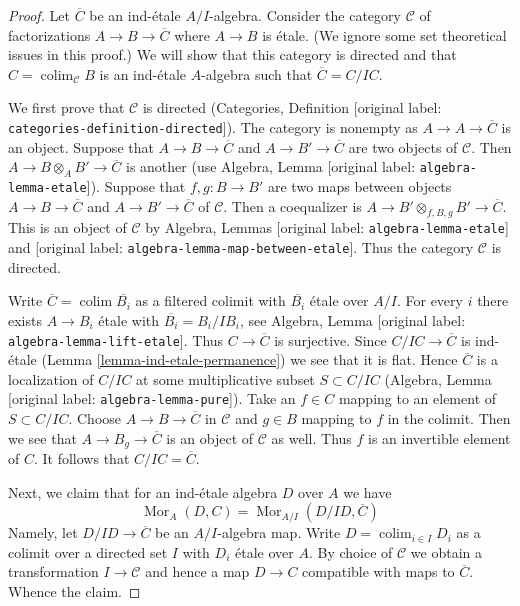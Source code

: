 \documentclass[10pt,a4paper]{article}
\theoremstyle{plain}
\theoremstyle{definition}
\theoremstyle{remark}
\numberwithin{equation}{subsection}
\def\colim{\mathop{\mathrm{colim}}\nolimits}
\def\Mor{\mathop{\mathrm{Mor}}\nolimits}
\begin{document}
\begin{proof}
Let $\overline{C}$ be an ind-\'etale $A/I$-algebra.
Consider the category $\mathcal{C}$ of factorizations
$A \to B \to \overline{C}$ where $A \to B$ is \'etale.
(We ignore some set theoretical issues in this proof.)
We will show that this category is directed and that
$C = \colim_\mathcal{C} B$ is an ind-\'etale $A$-algebra
such that $\overline{C} = C/IC$.

\medskip\noindent
We first prove that $\mathcal{C}$ is directed
(Categories, Definition \textnormal{[original label: \nolinkurl{categories-definition-directed}]}).
The category is nonempty as $A \to A \to \overline{C}$ is an object.
Suppose that $A \to B \to \overline{C}$ and $A \to B' \to \overline{C}$
are two objects of $\mathcal{C}$. Then $A \to B \otimes_A B' \to \overline{C}$
is another (use Algebra, Lemma \textnormal{[original label: \nolinkurl{algebra-lemma-etale}]}).
Suppose that $f, g : B \to B'$ are two maps between
objects $A \to B \to \overline{C}$ and $A \to B' \to \overline{C}$
of $\mathcal{C}$. Then a coequalizer is
$A \to B' \otimes_{f, B, g} B' \to \overline{C}$.
This is an object of $\mathcal{C}$ by
Algebra, Lemmas \textnormal{[original label: \nolinkurl{algebra-lemma-etale}]} and
\textnormal{[original label: \nolinkurl{algebra-lemma-map-between-etale}]}.
Thus the category $\mathcal{C}$ is directed.

\medskip\noindent
Write $\overline{C} = \colim \overline{B_i}$ as a filtered colimit with
$\overline{B_i}$ \'etale over $A/I$. For every $i$
there exists $A \to B_i$ \'etale with $\overline{B_i} = B_i/IB_i$, see
Algebra, Lemma \textnormal{[original label: \nolinkurl{algebra-lemma-lift-etale}]}.
Thus $C \to \overline{C}$ is surjective.
Since $C/IC \to \overline{C}$ is ind-\'etale
(Lemma \ref{lemma-ind-etale-permanence})
we see that it is flat. Hence $\overline{C}$ is a localization of
$C/IC$ at some multiplicative subset $S \subset C/IC$
(Algebra, Lemma \textnormal{[original label: \nolinkurl{algebra-lemma-pure}]}).
Take an $f \in C$ mapping to an element of $S \subset C/IC$.
Choose $A \to B \to \overline{C}$ in $\mathcal{C}$ and $g \in B$
mapping to $f$ in the colimit. Then we see that $A \to B_g \to \overline{C}$
is an object of $\mathcal{C}$ as well. Thus $f$ is an invertible
element of $C$. It follows that $C/IC = \overline{C}$.

\medskip\noindent
Next, we claim that for an ind-\'etale algebra $D$ over $A$ we have
$$
\Mor_A(D, C) = \Mor_{A/I}(D/ID, \overline{C})
$$
Namely, let $D/ID \to \overline{C}$ be an $A/I$-algebra map.
Write $D = \colim_{i \in I} D_i$ as a colimit over a directed set $I$
with $D_i$ \'etale over $A$. By choice of $\mathcal{C}$
we obtain a transformation $I \to \mathcal{C}$ and hence a map
$D \to C$ compatible with maps to $\overline{C}$. Whence the claim.


\end{proof}
\end{document}
